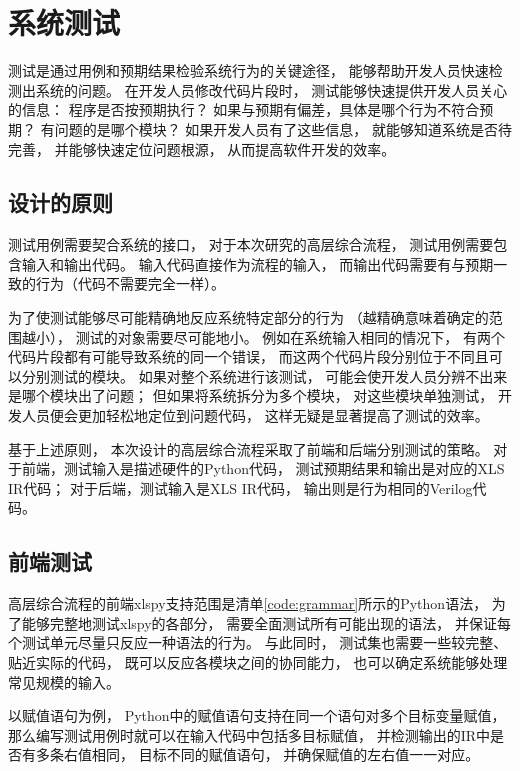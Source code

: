 \section{系统测试}

测试是通过用例和预期结果检验系统行为的关键途径，
能够帮助开发人员快速检测出系统的问题。
在开发人员修改代码片段时，
测试能够快速提供开发人员关心的信息：
程序是否按预期执行？
如果与预期有偏差，具体是哪个行为不符合预期？
有问题的是哪个模块？
如果开发人员有了这些信息，
就能够知道系统是否待完善，
并能够快速定位问题根源，
从而提高软件开发的效率。


\subsection{设计的原则}

测试用例需要契合系统的接口，
对于本次研究的高层综合流程，
测试用例需要包含输入和输出代码。
输入代码直接作为流程的输入，
而输出代码需要有与预期一致的行为（代码不需要完全一样）。

为了使测试能够尽可能精确地反应系统特定部分的行为
（越精确意味着确定的范围越小），
测试的对象需要尽可能地小。
例如在系统输入相同的情况下，
有两个代码片段都有可能导致系统的同一个错误，
而这两个代码片段分别位于不同且可以分别测试的模块。
如果对整个系统进行该测试，
可能会使开发人员分辨不出来是哪个模块出了问题；
但如果将系统拆分为多个模块，
对这些模块单独测试，
开发人员便会更加轻松地定位到问题代码，
这样无疑是显著提高了测试的效率。

基于上述原则，
本次设计的高层综合流程采取了前端和后端分别测试的策略。
对于前端，测试输入是描述硬件的Python代码，
测试预期结果和输出是对应的XLS IR代码；
对于后端，测试输入是XLS IR代码，
输出则是行为相同的Verilog代码。

\subsection{前端测试}

高层综合流程的前端xlspy支持范围是清单\ref{code:grammar}所示的Python语法，
为了能够完整地测试xlspy的各部分，
需要全面测试所有可能出现的语法，
并保证每个测试单元尽量只反应一种语法的行为。
与此同时，
测试集也需要一些较完整、贴近实际的代码，
既可以反应各模块之间的协同能力，
也可以确定系统能够处理常见规模的输入。

以赋值语句为例，
Python中的赋值语句支持在同一个语句对多个目标变量赋值，
那么编写测试用例时就可以在输入代码中包括多目标赋值，
并检测输出的IR中是否有多条右值相同，
目标不同的赋值语句，
并确保赋值的左右值一一对应。

